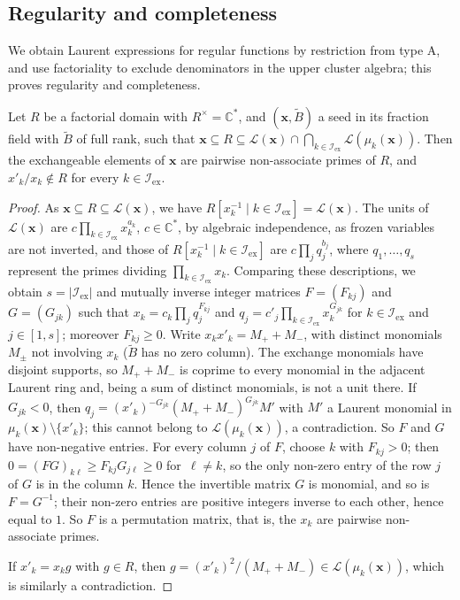 \documentclass[a4paper]{amsart}
\numberwithin{equation}{section}
\theoremstyle{definition}
\theoremstyle{remark}
\newcommand{\bbC}{\mathbb{C}}
\newcommand{\mcL}{\mathcal{L}}
\newcommand{\mcI}{\mathcal{I}}
\newcommand{\bx}{\mathbf{x}}
\newcommand{\tB}{\widetilde{B}}
\newcommand{\ex}{\mathrm{ex}}
\begin{document}
\subsection{Regularity and completeness}
We obtain Laurent expressions for regular functions by restriction from type A, and use factoriality to exclude denominators in the upper cluster algebra; this proves regularity and completeness.

\begin{lemma}
  \label{lem: primes}
  Let $R$ be a factorial domain with $R^\times=\bbC^*$, and $(\bx,\tB)$ a seed in its fraction field with $\tB$ of full rank, such that $\bx\subseteq R\subseteq\mcL(\bx)\cap\bigcap_{k\in \mcI_\ex}\mcL(\mu_k(\bx))$.
  Then the exchangeable elements of $\bx$ are pairwise non-associate primes of $R$, and $x'_k/x_k\notin R$ for every $k\in \mcI_\ex$.
\end{lemma}
\begin{proof}
  As $\bx\subseteq R\subseteq\mcL(\bx)$, we have $R[x_k^{-1}\mid k\in \mcI_\ex]=\mcL(\bx)$.
  The units of $\mcL(\bx)$ are $c\prod_{k\in \mcI_\ex}x_k^{a_k}$, $c\in\bbC^*$, by algebraic independence, as frozen variables are not inverted, and those of $R[x_k^{-1}\mid k\in \mcI_\ex]$ are $c\prod_jq_j^{b_j}$, where $q_1,\dots,q_s$ represent the primes dividing $\prod_{k\in \mcI_\ex}x_k$.
  Comparing these descriptions, we obtain $s=|\mcI_\ex|$ and mutually inverse integer matrices $F=(F_{kj})$ and $G=(G_{jk})$ such that $x_k=c_k\prod_jq_j^{F_{kj}}$ and $q_j=c'_j\prod_{k\in \mcI_\ex}x_k^{G_{jk}}$ for $k\in \mcI_\ex$ and $j\in[1,s]$; moreover $F_{kj}\ge0$.
  Write $x_kx'_k=M_++M_-$, with distinct monomials $M_\pm$ not involving $x_k$ ($\tB$ has no zero column).
  The exchange monomials have disjoint supports, so $M_++M_-$ is coprime to every monomial in the adjacent Laurent ring and, being a sum of distinct monomials, is not a unit there.
  If $G_{jk}<0$, then $q_j=(x'_k)^{-G_{jk}}(M_++M_-)^{G_{jk}}M'$ with $M'$ a Laurent monomial in $\mu_k(\bx)\setminus\{x'_k\}$; this cannot belong to $\mcL(\mu_k(\bx))$, a contradiction.
  So $F$ and $G$ have non-negative entries.
  For every column $j$ of $F$, choose $k$ with $F_{kj}>0$; then $0=(FG)_{k\ell}\ge F_{kj}G_{j\ell}\ge0$ for~$\ell\neq k$, so the only non-zero entry of the row $j$ of $G$ is in the column $k$.
  Hence the invertible matrix $G$ is monomial, and so is $F=G^{-1}$; their non-zero entries are positive integers inverse to each other, hence equal to $1$.
  So $F$ is a permutation matrix, that is, the $x_k$ are pairwise non-associate primes.

  If $x'_k=x_kg$ with $g\in R$, then $g=(x'_k)^2/(M_++M_-)\in\mcL(\mu_k(\bx))$, which is similarly a contradiction.
\end{proof}
\end{document}
